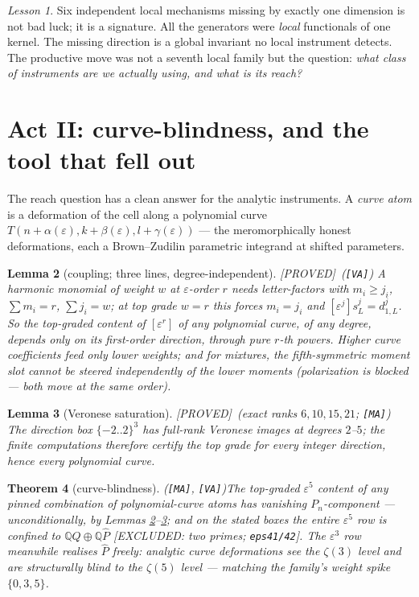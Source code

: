 \documentclass[11pt,reqno]{amsart}
\theoremstyle{plain}
\newtheorem{theorem}{Theorem}[section]
\newtheorem{lemma}[theorem]{Lemma}
\theoremstyle{definition}
\theoremstyle{remark}
\newtheorem{lesson}[theorem]{Lesson}
\newcommand{\Q}{\mathbb{Q}}
\newcommand{\Proved}{\textup{\textsf{[PROVED]}}}
\newcommand{\ExcludedR}[1]{\textup{\textsf{[EXCLUDED: #1]}}}
\newcommand{\MA}{\texttt{[MA]}}
\newcommand{\VA}{\texttt{[VA]}}
\begin{document}
\begin{lesson}\label{les:local}
Six independent local mechanisms missing by exactly one dimension is not
bad luck; it is a signature. All the generators were \emph{local}
functionals of one kernel. The missing direction is a global invariant no
local instrument detects. The productive move was not a seventh local
family but the question: \emph{what class of instruments are we actually
using, and what is its reach?}
\end{lesson}

\section{Act II: curve-blindness, and the tool that fell out}
\label{sec:blind}

The reach question has a clean answer for the analytic instruments. A
\emph{curve atom} is a deformation of the cell along a polynomial curve
$T(n+\alpha(\varepsilon),k+\beta(\varepsilon),l+\gamma(\varepsilon))$ ---
the meromorphically honest deformations, each a Brown--Zudilin parametric
integrand at shifted parameters.

\begin{lemma}[coupling; three lines, degree-independent]\label{lem:coupling}
\Proved\ (\VA)\quad
A harmonic monomial of weight $w$ at $\varepsilon$-order $r$ needs
letter-factors with $m_i\ge j_i$, $\sum m_i=r$, $\sum j_i=w$; at top grade
$w=r$ this forces $m_i=j_i$ and $[\varepsilon^j]s_L^j=d_{1,L}^j$. So the
top-graded content of $[\varepsilon^r]$ of \emph{any} polynomial curve,
of any degree, depends only on its first-order direction, through pure
$r$-th powers. Higher curve coefficients feed only lower weights; and for
mixtures, the fifth-symmetric moment slot cannot be steered independently
of the lower moments (polarization is blocked --- both move at the same
order).
\end{lemma}

\begin{lemma}[Veronese saturation]\label{lem:sat}
\Proved\ (exact ranks $6,10,15,21$; \MA)\quad
The direction box $\{-2..2\}^3$ has full-rank Veronese images at degrees
$2$--$5$; the finite computations therefore certify the top grade for
\emph{every} integer direction, hence every polynomial curve.
\end{lemma}

\begin{theorem}[curve-blindness]\label{thm:blind}
(\MA, \VA)\quad The top-graded $\varepsilon^5$ content of any pinned
combination of polynomial-curve atoms has vanishing $P_n$-component ---
unconditionally, by Lemmas \ref{lem:coupling}--\ref{lem:sat}; and on the
stated boxes the entire $\varepsilon^5$ row is confined to
$\Q Q\oplus\Q\hat P$ \ExcludedR{two primes; \texttt{eps41/42}}. The
$\varepsilon^3$ row meanwhile realises $\hat P$ freely: analytic curve
deformations see the $\zeta(3)$ level and are structurally blind to the
$\zeta(5)$ level --- matching the family's weight spike $\{0,3,5\}$.
\end{theorem}
\end{document}
